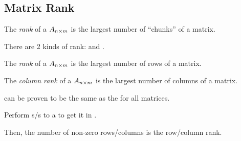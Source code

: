 \subsection{Matrix Rank}\label{subsec:Matrix_Rank}
\begin{definition}[Rank]\label{def:Matrix_Rank}
  The \emph{rank} of a  $A_{n \times m}$ is the largest number of  ``chunks'' of a matrix.

  There are 2 kinds of rank:  and .

  \begin{remark}\label{rmk:Row_Rank}
    The \emph{rank} of a  $A_{n \times m}$ is the largest number of  rows of a matrix.
  \end{remark}

  \begin{remark}\label{rmk:Column_Rank}
    The \emph{column rank} of a  $A_{n \times m}$ is the largest number of  columns of a matrix.
  \end{remark}

  \begin{remark}
     can be proven to be the same as the  for all matrices.
  \end{remark}
\end{definition}

\begin{theorem}
  Perform s/s to a  to get it in .

  Then, the number of non-zero rows/columns is the row/column rank.
\end{theorem}

